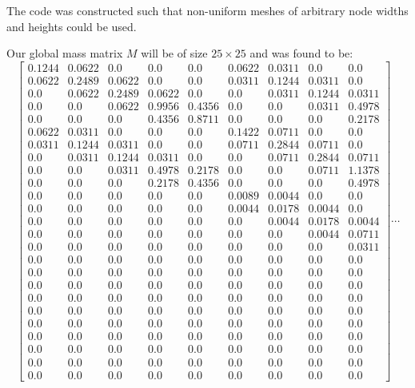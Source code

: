 \documentclass[12pt]{article}
\begin{document}
The code was constructed such that non-uniform meshes of arbitrary node widths and heights could be used.

Our global mass matrix $M$ will be of size $25 \times 25$ and was found to be:
\[\left[\begin{matrix}0.1244 & 0.0622 & 0.0 & 0.0 & 0.0 & 0.0622 & 0.0311 & 0.0 & 0.0\\0.0622 & 0.2489 & 0.0622 & 0.0 & 0.0 & 0.0311 & 0.1244 & 0.0311 & 0.0\\0.0 & 0.0622 & 0.2489 & 0.0622 & 0.0 & 0.0 & 0.0311 & 0.1244 & 0.0311\\0.0 & 0.0 & 0.0622 & 0.9956 & 0.4356 & 0.0 & 0.0 & 0.0311 & 0.4978\\0.0 & 0.0 & 0.0 & 0.4356 & 0.8711 & 0.0 & 0.0 & 0.0 & 0.2178\\0.0622 & 0.0311 & 0.0 & 0.0 & 0.0 & 0.1422 & 0.0711 & 0.0 & 0.0\\0.0311 & 0.1244 & 0.0311 & 0.0 & 0.0 & 0.0711 & 0.2844 & 0.0711 & 0.0\\0.0 & 0.0311 & 0.1244 & 0.0311 & 0.0 & 0.0 & 0.0711 & 0.2844 & 0.0711\\0.0 & 0.0 & 0.0311 & 0.4978 & 0.2178 & 0.0 & 0.0 & 0.0711 & 1.1378\\0.0 & 0.0 & 0.0 & 0.2178 & 0.4356 & 0.0 & 0.0 & 0.0 & 0.4978\\0.0 & 0.0 & 0.0 & 0.0 & 0.0 & 0.0089 & 0.0044 & 0.0 & 0.0\\0.0 & 0.0 & 0.0 & 0.0 & 0.0 & 0.0044 & 0.0178 & 0.0044 & 0.0\\0.0 & 0.0 & 0.0 & 0.0 & 0.0 & 0.0 & 0.0044 & 0.0178 & 0.0044\\0.0 & 0.0 & 0.0 & 0.0 & 0.0 & 0.0 & 0.0 & 0.0044 & 0.0711\\0.0 & 0.0 & 0.0 & 0.0 & 0.0 & 0.0 & 0.0 & 0.0 & 0.0311\\0.0 & 0.0 & 0.0 & 0.0 & 0.0 & 0.0 & 0.0 & 0.0 & 0.0\\0.0 & 0.0 & 0.0 & 0.0 & 0.0 & 0.0 & 0.0 & 0.0 & 0.0\\0.0 & 0.0 & 0.0 & 0.0 & 0.0 & 0.0 & 0.0 & 0.0 & 0.0\\0.0 & 0.0 & 0.0 & 0.0 & 0.0 & 0.0 & 0.0 & 0.0 & 0.0\\0.0 & 0.0 & 0.0 & 0.0 & 0.0 & 0.0 & 0.0 & 0.0 & 0.0\\0.0 & 0.0 & 0.0 & 0.0 & 0.0 & 0.0 & 0.0 & 0.0 & 0.0\\0.0 & 0.0 & 0.0 & 0.0 & 0.0 & 0.0 & 0.0 & 0.0 & 0.0\\0.0 & 0.0 & 0.0 & 0.0 & 0.0 & 0.0 & 0.0 & 0.0 & 0.0\\0.0 & 0.0 & 0.0 & 0.0 & 0.0 & 0.0 & 0.0 & 0.0 & 0.0\\0.0 & 0.0 & 0.0 & 0.0 & 0.0 & 0.0 & 0.0 & 0.0 & 0.0\end{matrix}\right]\cdots\]
\end{document}
